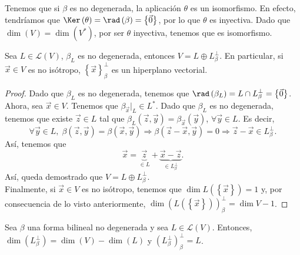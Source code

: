 \begin{observation}
	\normalfont Tenemos que si $\displaystyle \beta  $ es no degenerada, la aplicación $\displaystyle \theta $ es un isomorfismo. En efecto, tendríamos que $\displaystyle \Ker\left(\theta \right) = \rad\left(\beta \right) = \left\{ \vec{0}\right\}  $, por lo que $\displaystyle \theta  $ es inyectiva. Dado que $\displaystyle \dim\left(V\right) = \dim\left(V^{*}\right) $, por ser $\displaystyle \theta  $ inyectiva, tenemos que es isomorfismo.
\end{observation}
\begin{ftheorem}[]
	\normalfont Sea $\displaystyle L \in \mathcal{L}\left(V\right) $, $\displaystyle \beta_{L} $ es no degenerada, entonces $\displaystyle V = L \oplus L^{\perp }_{\beta } $. En particular, si $\displaystyle \vec{x} \in V $ es no isótropo, $\displaystyle \left\{ \vec{x}\right\} ^{\perp }_{\beta } $ es un hiperplano vectorial.
\end{ftheorem}
\begin{proof}
	Dado que $\displaystyle \beta_{L} $ es no degenerada, tenemos que $\displaystyle \rad\left(\beta_{L}\right) = L\cap L^{\perp}_{\beta} = \left\{ \vec{0}\right\} $. \\
	Ahora, sea $\displaystyle \vec{x} \in V $. Tenemos que $\displaystyle \beta_{\vec{x}}|_{L} \in L^{*}$. Dado que $\displaystyle \beta_{L} $ es no degenerada, tenemos que existe $\displaystyle \vec{z} \in L $ tal que $\displaystyle \beta_{L}\left(\vec{z}, \vec{y}\right) = \beta_{\vec{x}}\left(\vec{y}\right) $, $\displaystyle \forall \vec{y} \in L $. Es decir, 
	\[ \forall \vec{y} \in L, \; \beta\left(\vec{z}, \vec{y}\right) = \beta\left(\vec{x}, \vec{y}\right) \Rightarrow \beta\left(\vec{z}-\vec{x}, \vec{y}\right) = 0 \Rightarrow \vec{z}-\vec{x} \in L^{\perp }_{\beta} .\]
	Así, tenemos que 
	\[ \vec{x} = \underbrace{\vec{z} }_{\in L} + \underbrace{\vec{x}-\vec{z}}_{\in L^{\perp}_{\beta}} .\]
Así, queda demostrado que $\displaystyle V = L \oplus L^{\perp }_{\beta } $. \\ 
Finalmente, si $\displaystyle \vec{x} \in V $ es no isótropo, tenemos que $\displaystyle \dim L\left( \left\{ \vec{x}\right\} \right) = 1 $ y, por consecuencia de lo visto anteriormente, $\displaystyle \dim\left(L\left( \left\{ \vec{x}\right\} \right)\right)^{\perp }_{\beta} = \dim V - 1 $.
\end{proof}
\begin{ftheorem}[]
\normalfont Sea $\displaystyle \beta  $ una forma bilineal no degenerada y sea $\displaystyle L \in \mathcal{L}\left(V\right) $. Entonces, $\displaystyle \dim\left(L^{\perp }_{\beta }\right) = \dim \left(V\right) - \dim \left(L\right) $ y $\displaystyle \left(L^{\perp }_{\beta }\right)^{\perp }_{\beta } = L $.
\end{ftheorem}
